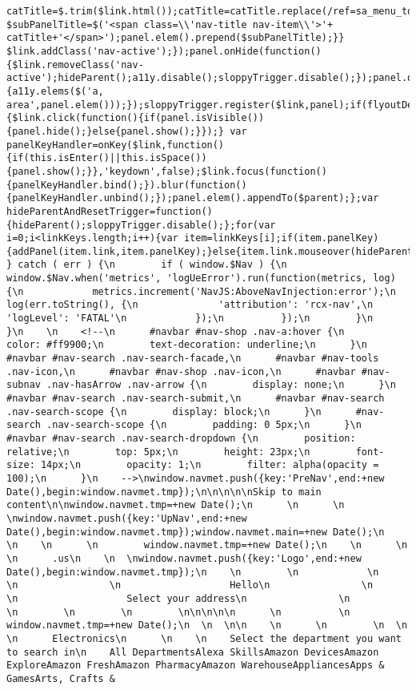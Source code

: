 \documentclass[
]{article}
\begin{document}
\begin{verbatim}
catTitle=$.trim($link.html());catTitle=catTitle.replace(/ref=sa_menu_top/g,'ref=sa_menu');var $subPanelTitle=$('<span class=\\'nav-title nav-item\\'>'+ catTitle+'</span>');panel.elem().prepend($subPanelTitle);}} $link.addClass('nav-active');});panel.onHide(function(){$link.removeClass('nav-active');hideParent();a11y.disable();sloppyTrigger.disable();});panel.onShow(function(){a11y.elems($('a, area',panel.elem()));});sloppyTrigger.register($link,panel);if(flyoutDebug){$link.click(function(){if(panel.isVisible()){panel.hide();}else{panel.show();}});} var panelKeyHandler=onKey($link,function(){if(this.isEnter()||this.isSpace()){panel.show();}},'keydown',false);$link.focus(function(){panelKeyHandler.bind();}).blur(function(){panelKeyHandler.unbind();});panel.elem().appendTo($parent);};var hideParentAndResetTrigger=function(){hideParent();sloppyTrigger.disable();};for(var i=0;i<linkKeys.length;i++){var item=linkKeys[i];if(item.panelKey){addPanel(item.link,item.panelKey);}else{item.link.mouseover(hideParentAndResetTrigger);}}};});};\n      } catch ( err ) {\n        if ( window.$Nav ) {\n          window.$Nav.when('metrics', 'logUeError').run(function(metrics, log) {\n            metrics.increment('NavJS:AboveNavInjection:error');\n            log(err.toString(), {\n              'attribution': 'rcx-nav',\n              'logLevel': 'FATAL'\n            });\n          });\n        }\n      }\n    \n    <!--\n      #navbar #nav-shop .nav-a:hover {\n        color: #ff9900;\n        text-decoration: underline;\n      }\n      #navbar #nav-search .nav-search-facade,\n      #navbar #nav-tools .nav-icon,\n      #navbar #nav-shop .nav-icon,\n      #navbar #nav-subnav .nav-hasArrow .nav-arrow {\n        display: none;\n      }\n      #navbar #nav-search .nav-search-submit,\n      #navbar #nav-search .nav-search-scope {\n        display: block;\n      }\n      #nav-search .nav-search-scope {\n        padding: 0 5px;\n      }\n      #navbar #nav-search .nav-search-dropdown {\n        position: relative;\n        top: 5px;\n        height: 23px;\n        font-size: 14px;\n        opacity: 1;\n        filter: alpha(opacity = 100);\n      }\n    -->\nwindow.navmet.push({key:'PreNav',end:+new Date(),begin:window.navmet.tmp});\n\n\n\n\nSkip to main content\n\nwindow.navmet.tmp=+new Date();\n      \n      \n    \nwindow.navmet.push({key:'UpNav',end:+new Date(),begin:window.navmet.tmp});window.navmet.main=+new Date();\n    \n    \n      \n        window.navmet.tmp=+new Date();\n    \n      \n      \n      .us\n    \n  \nwindow.navmet.push({key:'Logo',end:+new Date(),begin:window.navmet.tmp});\n    \n        \n            \n            \n                \n                   Hello\n                \n                \n                   Select your address\n                \n            \n        \n        \n        \n\n\n\n\n      \n          \n            window.navmet.tmp=+new Date();\n  \n  \n\n    \n      \n        \n  \n    \n      Electronics\n      \n    \n    Select the department you want to search in\n    All DepartmentsAlexa SkillsAmazon DevicesAmazon ExploreAmazon FreshAmazon PharmacyAmazon WarehouseAppliancesApps & GamesArts, Crafts & 
\end{verbatim}
\end{document}
